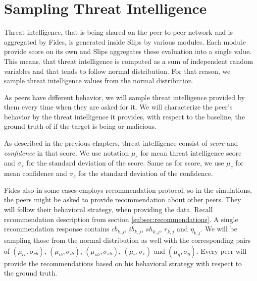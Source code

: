 \section{Sampling Threat Intelligence}
\label{sec:sampling-threat-intelligence}
Threat intelligence, that is being shared on the peer-to-peer network and is aggregated by Fides, is generated inside Slips by various modules.
Each module provide score on its own and Slips aggregates these evaluation into a single value. 
This means, that threat intelligence is computed as a sum of independent random variables and that tends to follow normal distribution. 
For that reason, we sample threat intelligence values from the normal distribution.

As peers have different behavior, we will sample threat intelligence provided by them every time when they are asked for it.
We will characterize the peer's behavior by the threat intelligence it provides, with respect to the baseline, the ground truth of if the target is being or malicious.

As described in the previous chapters, threat intelligence consist of \textit{score} and \textit{confidence} in that score.
We use notation $\mu_{s}$ for mean threat intelligence score and $\sigma_{s}$ for the standard deviation of the score. 
Same as for score, we use $\mu_{c}$ for mean confidence and $\sigma_{c}$ for the standard deviation of the confidence. 

Fides also in some cases employs recommendation protocol, so in the simulations, the peers might be asked to provide recommendation about other peers.
They will follow their behavioral strategy, when providing the data. 
Recall recommendation description from section \ref{subsec:recommendations}. A single recommendation response contains $cb_{k,j}$, $ib_{k,j}$, $sh_{k,j}$, $r_{k,j}$ and $\eta_{k,j}$. 
We will be sampling those from the normal distribution as well with the corresponding pairs of $(\mu_{cb}, \sigma_{cb})$, $(\mu_{ib}, \sigma_{ib})$, $(\mu_{sh}, \sigma_{sh})$, $(\mu_{r}, \sigma_{r})$ and $(\mu_{\eta}, \sigma_{\eta})$.
Every peer will provide the recommendations based on his behavioral strategy with respect to the ground truth.

